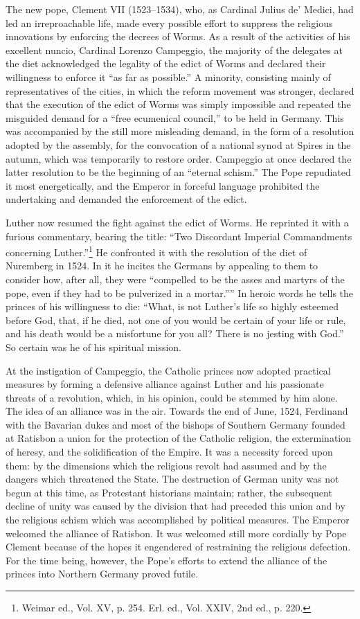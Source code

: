 The new pope, Clement VII (1523--1534), who, as Cardinal Julius
de’ Medici, had led an irreproachable life, made every possible effort
to suppress the religious innovations by enforcing the decrees of
Worms. As a result of the activities of his excellent nuncio, Cardinal
Lorenzo Campeggio, the majority of the delegates at the diet
acknowledged the legality of the edict of Worms and declared their
willingness to enforce it “as far as possible.” A minority, consisting
mainly of representatives of the cities, in which the reform movement
was stronger, declared that the execution of the edict of
Worms was simply impossible and repeated the misguided demand
for a “free ecumenical council,” to be held in Germany. This was
accompanied by the still more misleading demand, in the form of a
resolution adopted by the assembly, for the convocation of a national
synod at Spires in the autumn, which was temporarily to restore
order. Campeggio at once declared the latter resolution to be the
beginning of an “eternal schism.” The Pope repudiated it most
energetically, and the Emperor in forceful language prohibited the
undertaking and demanded the enforcement of the edict.

Luther now resumed the fight against the edict of Worms. He
reprinted it with a furious commentary, bearing the title: “Two
Discordant Imperial Commandments concerning Luther.”\footnote
{Weimar ed., Vol. XV, p. 254. Erl. ed., Vol. XXIV, 2nd ed., p. 220.}
He confronted it with the resolution of the diet of Nuremberg in 1524. In
it he incites the Germans by appealing to them to consider how, after
all, they were “compelled to be the asses and martyrs of the pope,
even if they had to be pulverized in a mortar.”” In heroic words he
tells the princes of his willingness to die: “What, is not Luther’s
life so highly esteemed before God, that, if he died, not one of you
would be certain of your life or rule, and his death would be a
misfortune for you all? There is no jesting with God.” So certain
was he of his spiritual mission.

At the instigation of Campeggio, the Catholic princes now adopted
practical measures by forming a defensive alliance against Luther
and his passionate threats of a revolution, which, in his opinion, could
be stemmed by him alone. The idea of an alliance was in the air.
Towards the end of June, 1524, Ferdinand with the Bavarian dukes
and most of the bishops of Southern Germany founded at Ratisbon
a union for the protection of the Catholic religion, the extermination
of heresy, and the solidification of the Empire. It was a necessity
forced upon them: by the dimensions which the religious revolt had
assumed and by the dangers which threatened the State. The destruction
of German unity was not begun at this time, as Protestant historians
maintain; rather, the subsequent decline of unity was caused
by the division that had preceded this union and by the religious
schism which was accomplished by political measures. The Emperor
welcomed the alliance of Ratisbon. It was welcomed still more cordially
by Pope Clement because of the hopes it engendered of restraining the religious
defection. For the time being, however, the Pope’s
efforts to extend the alliance of the princes into Northern Germany
proved futile.

